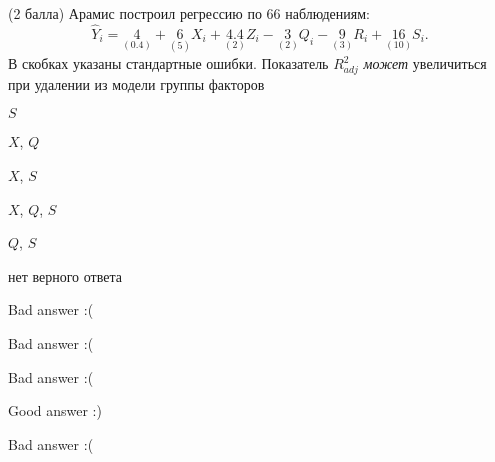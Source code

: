 
\begin{question}
(2 балла) Арамис построил регрессию по 66 наблюдениям: \[
\hat Y_i = \underset{(0.4)}{4} + \underset{(5)}{6}X_i + \underset{(2)}{4.4} Z_i - \underset{(2)}{3} Q_i - \underset{(3)}{9} R_i + \underset{(10)}{16} S_i.
\]
В скобках указаны стандартные ошибки.
Показатель \(R^2_{adj}\) \emph{может} увеличиться при удалении из
модели группы факторов
\begin{answerlist}
  \item \(S\)
  \item \(X\), \(Q\)
  \item \(X\), \(S\)
  \item \(X\), \(Q\), \(S\)
  \item \(Q\), \(S\)
  \item нет верного ответа
\end{answerlist}
\end{question}

\begin{solution}
\begin{answerlist}
  \item Bad answer :(
  \item Bad answer :(
  \item Bad answer :(
  \item Good answer :)
  \item Bad answer :(
\end{answerlist}
\end{solution}
